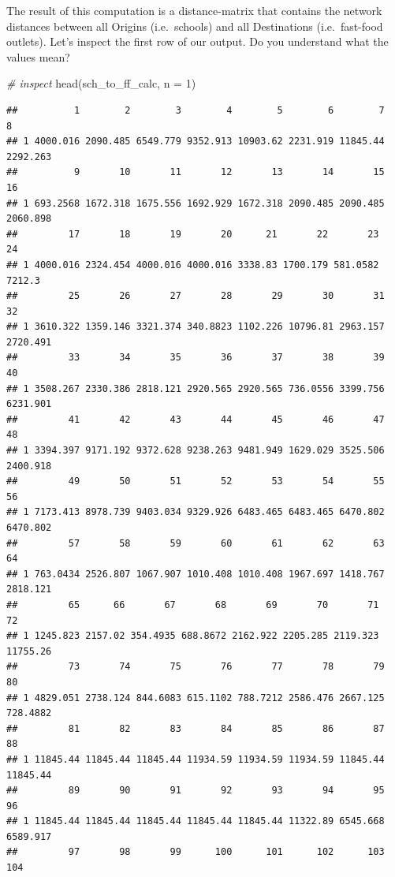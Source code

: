 \documentclass[
]{book}
\newenvironment{Shaded}{\begin{snugshade}}{\end{snugshade}}
\newcommand{\AttributeTok}[1]{\textcolor[rgb]{0.77,0.63,0.00}{#1}}
\newcommand{\CommentTok}[1]{\textcolor[rgb]{0.56,0.35,0.01}{\textit{#1}}}
\newcommand{\DecValTok}[1]{\textcolor[rgb]{0.00,0.00,0.81}{#1}}
\newcommand{\FunctionTok}[1]{\textcolor[rgb]{0.00,0.00,0.00}{#1}}
\newcommand{\NormalTok}[1]{#1}
\begin{document}
The result of this computation is a distance-matrix that contains the network distances between all Origins (i.e.~schools) and all Destinations (i.e.~fast-food outlets). Let's inspect the first row of our output. Do you understand what the values mean?

\begin{Shaded}
\begin{Highlighting}[]
\CommentTok{\# inspect}
\FunctionTok{head}\NormalTok{(sch\_to\_ff\_calc, }\AttributeTok{n =} \DecValTok{1}\NormalTok{)}
\end{Highlighting}
\end{Shaded}

\begin{verbatim}
##          1        2        3        4        5        6        7        8
## 1 4000.016 2090.485 6549.779 9352.913 10903.62 2231.919 11845.44 2292.263
##          9       10       11       12       13       14       15       16
## 1 693.2568 1672.318 1675.556 1692.929 1672.318 2090.485 2090.485 2060.898
##         17       18       19       20      21       22       23     24
## 1 4000.016 2324.454 4000.016 4000.016 3338.83 1700.179 581.0582 7212.3
##         25       26       27       28       29       30       31       32
## 1 3610.322 1359.146 3321.374 340.8823 1102.226 10796.81 2963.157 2720.491
##         33       34       35       36       37       38       39       40
## 1 3508.267 2330.386 2818.121 2920.565 2920.565 736.0556 3399.756 6231.901
##         41       42       43       44       45       46       47       48
## 1 3394.397 9171.192 9372.628 9238.263 9481.949 1629.029 3525.506 2400.918
##         49       50       51       52       53       54       55       56
## 1 7173.413 8978.739 9403.034 9329.926 6483.465 6483.465 6470.802 6470.802
##         57       58       59       60       61       62       63       64
## 1 763.0434 2526.807 1067.907 1010.408 1010.408 1967.697 1418.767 2818.121
##         65      66       67       68       69       70       71       72
## 1 1245.823 2157.02 354.4935 688.8672 2162.922 2205.285 2119.323 11755.26
##         73       74       75       76       77       78       79       80
## 1 4829.051 2738.124 844.6083 615.1102 788.7212 2586.476 2667.125 728.4882
##         81       82       83       84       85       86       87       88
## 1 11845.44 11845.44 11845.44 11934.59 11934.59 11934.59 11845.44 11845.44
##         89       90       91       92       93       94       95       96
## 1 11845.44 11845.44 11845.44 11845.44 11845.44 11322.89 6545.668 6589.917
##         97       98       99      100      101      102      103      104

\end{verbatim}
\end{document}
